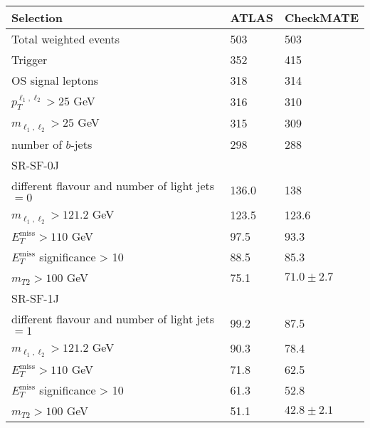 \documentclass[10pt,fleqn]{article}
\begin{document}
\begin{enumerate}
\begin{table}[h!] \centering 
 \renewcommand*{\arraystretch}{1.2}
 \begin{tabular}{l|p{1.5cm}|p{1.5cm}} \toprule
  Selection                                                                       & ATLAS    & CheckMATE       \\ \midrule
  Total weighted events                                                           &   503   &    503     \\
  Trigger                                                                         &   352   &    415\\
  OS signal leptons                                                               &   318   &    314\\
  $p_T^{\ell_1,\ell_2} > 25$ GeV                                                  &   316   &    310\\
  $m_{\ell_1,\ell_2} > 25  $ GeV                                                  &   315   &    309\\
  number of $b$-jets                                                              &   298   &    288\\   \midrule
  SR-SF-0J  & &\\ \midrule
  different flavour and number of light jets $=0$                                 &  136.0    &  138 \\
  $m_{\ell_1,\ell_2} > 121.2  $ GeV                                               &  123.5    &  123.6 \\
  $E_T^\mathrm{miss} > 110$ GeV                                                   &   97.5    &  93.3 \\
  $E_T^\mathrm{miss}$ significance > 10                                           &   88.5   &   85.3\\
  $m_{T2} >  100$ GeV                                                             &   75.1   &   $71.0 \pm 2.7$\\ \midrule     
  SR-SF-1J  & &\\ \midrule
  different flavour and number of light jets $=1$                                 &   99.2   &   87.5\\
  $m_{\ell_1,\ell_2} > 121.2  $ GeV                                               &   90.3   &   78.4\\
  $E_T^\mathrm{miss} > 110$ GeV                                                   &   71.8   &   62.5\\
  $E_T^\mathrm{miss}$ significance > 10                                           &   61.3   &   52.8\\
  $m_{T2} >  100$ GeV                                                             &   51.1   &   $42.8 \pm 2.1$\\ \bottomrule
 \end{tabular}
\end{table} 
 
 
\end{enumerate}
\end{document}

